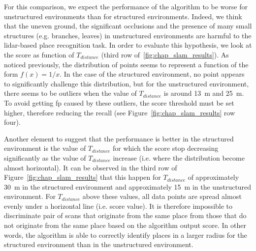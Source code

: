For this comparison, we expect the performance of the algorithm to be worse for unstructured environments than for structured environments. Indeed, we think that the uneven ground, the significant occlusions and the presence of many small structures (e.g. branches, leaves) in unstructured environments are harmful to the \gls*{lidar}-based place recognition task. In order to evaluate this hypothesis, we look at the score as function of $T_{distance}$ (third row of~\ref{fig:chap_slam_results}). As noticed previously, the distribution of points seems to represent a function of the form $f(x) = 1 / x$. In the case of the structured environment, no point appears to significantly challenge this distribution, but for the unstructured environment, there seems to be outliers when the value of $T_{distance}$ is around \SI{13}{\meter} and \SI{25}{\meter}. To avoid getting \gls*{fp} caused by these outliers, the score threshold must be set higher, therefore reducing the recall (see Figure~\ref{fig:chap_slam_results} row four).

Another element to suggest that the performance is better in the structured environment is the value of $T_{distance}$ for which the score stop decreasing significantly as the value of $T_{distance}$ increase (i.e. where the distribution become almost horizontal). It can be observed in the third row of Figure~\ref{fig:chap_slam_results} that this happen for $T_{distance}$ of approximately \SI{30}{\meter} in the structured environment and approximately \SI{15}{\meter} in the unstructured environment. For $T_{distance}$ above these values, all data points are spread almost evenly under a horizontal line (i.e. score value). It is therefore impossible to discriminate pair of scans that originate from the same place from those that do not originate from the same place based on the algorithm output score. In other words, the algorithm is able to correctly identify places in a larger radius for the structured environment than in the unstructured environment.


